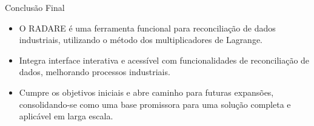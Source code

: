 \begin{frame}{Conclusão Final}
    \begin{itemize}
        \item O RADARE é uma ferramenta funcional para reconciliação de dados industriais, utilizando o método dos multiplicadores de Lagrange.
        \item Integra interface interativa e acessível com funcionalidades de reconciliação de dados, melhorando processos industriais.
        \item Cumpre os objetivos iniciais e abre caminho para futuras expansões, consolidando-se como uma base promissora para uma solução completa e aplicável em larga escala.
    \end{itemize}
\end{frame}
